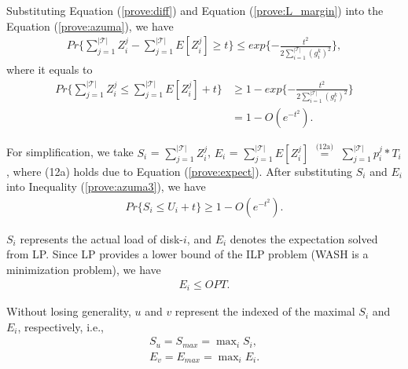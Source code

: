 \documentclass[conference]{IEEEtran}
\begin{document}
\vspace{-0.1cm}
Substituting Equation (\ref{prove:diff}) and Equation (\ref{prove:L_margin}) into the  Equation (\ref{prove:azuma}), we have  
\vspace{-0.2cm}
\begin{align}
Pr\{\sum\nolimits_{j = 1}^{|\mathcal{T}|} Z_i^j - 
	\sum\nolimits_{j = 1}^{|\mathcal{T}|} E[Z_i^j]\geq t\} \leq exp\{-\frac{t^2}{2\sum_{ i = 1 }^{|\mathcal{T}|}(g_i^k)^2}\},\nonumber
\end{align}
 \vspace{-0.2cm}
 where it equals to
\begin{align}
Pr\{\sum_{j = 1}^{|\mathcal{T}|} Z_i^j \leq \sum_{j = 1}^{|\mathcal{T}|} E[Z_i^j] + t\} & \geq 1 - exp\{-\frac{t^2}{2\sum_{ i = 1 }^{|\mathcal{T}|}(g_i^k)^2}\}\nonumber\\
& = 1 - O(e^{-t^2}).\label{prove:azuma3}
\end{align}

\vspace{-0.2cm}
For simplification, we take $S_i$  = $\sum_{j = 1}^{|\mathcal{T}|} Z_i^j$,
$E_i$ = $\sum_{j = 1}^{|\mathcal{T}|} E[Z_i^j]$
$\overset{\text{(12a)}}{=}$
$\sum_{j = 1}^{|\mathcal{T}|} p_i^j*T_i$, where (12a) holds due to Equation (\ref{prove:expect}). After substituting $S_i$ and $E_i$ into Inequality (\ref{prove:azuma3}), we have
\vspace{-0.2cm}
\begin{align}
Pr\{S_i \leq U_i + t\} \geq 1- O(e^{-t^2}). \label{prove:SU}
\end{align}

\vspace{-0.2cm}
$S_i$ represents the actual load of disk-$i$, and $E_i$ denotes the expectation solved from  LP. Since LP provides a lower bound of the ILP problem (WASH is a minimization problem), we have
\vspace{-0.2cm}
\begin{align}
E_i \leq OPT.\label{prove:OPT}
\end{align}

\vspace{-0.2cm}
Without losing generality, $u$ and $v$ represent the indexed of the maximal $S_i$ and $E_i$, respectively, i.e.,
\vspace{-0.3cm}
\begin{align}
	S_u = S_{max} = \max\nolimits_i S_i,\\
	E_v = E_{max} = \max\nolimits_i E_i.\label{prove:Emax}
\end{align}
\end{document}
